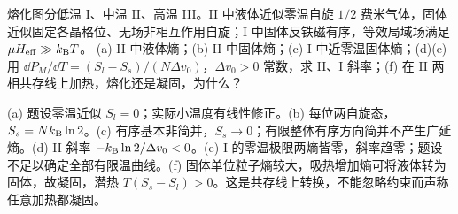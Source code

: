 \begin{exercise}
熔化图分低温 I、中温 II、高温 III。II 中液体近似零温自旋 $1/2$ 费米气体，固体近似固定各晶格位、无场非相互作用自旋；I 中固体反铁磁有序，等效局域场满足 $\mu H_{\rm eff}\gg k_{\mathrm B} T$。
(a) II 中液体熵；(b) II 中固体熵；(c) I 中近零温固体熵；(d)(e) 用 $\dd P_M/\dd T=(S_l-S_s)/(N\Delta v_0)$，$\Delta v_0>0$ 常数，求 II、I 斜率；(f) 在 II 两相共存线上加热，熔化还是凝固，为什么？
\end{exercise}
\begin{solution}
(a) 题设零温近似 $S_l=0$；实际小温度有线性修正。(b) 每位两自旋态，$S_s=Nk_{\mathrm B}\ln2$。(c) 有序基本非简并，$S_s\to0$；有限整体有序方向简并不产生广延熵。(d) II 斜率 $-k_{\mathrm B}\ln2/\Delta v_0<0$。(e) I 的零温极限两熵皆零，斜率趋零；题设不足以确定全部有限温曲线。(f) 固体单位粒子熵较大，吸热增加熵可将液体转为固体，故凝固，潜热 $T(S_s-S_l)>0$。这是共存线上转换，不能忽略约束而声称任意加热都凝固。
\end{solution}
